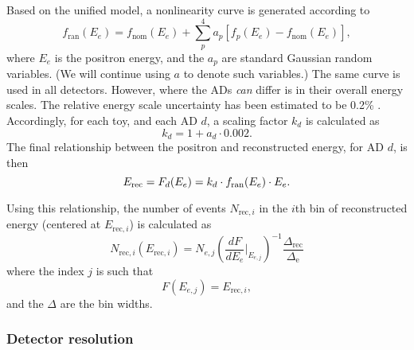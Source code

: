 \documentclass[../thesis.tex]{subfiles}
\begin{document}
Based on the unified model, a nonlinearity curve is generated according to
\begin{equation}
  \label{eq:fitRandomNL}
  f_{\mathrm{ran}}(E_e) = f_{\mathrm{nom}}(E_e) + \sum_p^4 a_p [ f_p(E_e) - f_{\mathrm{nom}}(E_e)],
\end{equation}
where $E_e$ is the positron energy, and the $a_p$ are standard Gaussian random variables. (We will continue using $a$ to denote such variables.) The same curve is used in all detectors. However, where the ADs \textit{can} differ is in their overall energy scales. The relative energy scale uncertainty has been estimated to be 0.2\% \cite{berkeley_shapefit_P14A}. Accordingly, for each toy, and each AD $d$, a scaling factor $k_d$ is calculated as
\begin{equation}
  k_d = 1 + a_d \cdot 0.002.
\end{equation}
The final relationship between the positron and reconstructed energy, for AD $d$, is then
\begin{equation}
  E_\mathrm{rec} = F_d(E_e) = k_d \cdot f_{\mathrm{ran}}(E_e) \cdot E_e.
\end{equation}

Using this relationship, the number of events $N_{\mathrm{rec},i}$ in the $i$th bin of reconstructed energy (centered at $E_{\mathrm{rec},i}$) is calculated as
\begin{equation}
  \label{eq:fitNrec}
  N_{\mathrm{rec},i}(E_{\mathrm{rec},i}) = N_{e,j} \left( \frac{dF}{dE_e} \Bigr|_{E_{e,j}} \right)^{-1} \frac{\Delta_{\mathrm{rec}}}{\Delta_{\mathrm{e}}}
\end{equation}
where the index $j$ is such that
\begin{equation}
  F(E_{e,j}) = E_{\mathrm{rec},i},
\end{equation}
and the $\Delta$ are the bin widths.

\subsubsection{Detector resolution}
\end{document}
